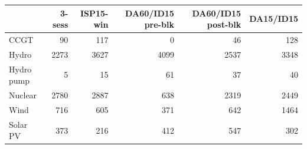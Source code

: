 \begin{tabular}{l r r r r r}
\toprule
 & 3-sess & ISP15-win & DA60/ID15 pre-blk & DA60/ID15 post-blk & DA15/ID15 \\
\midrule
CCGT & 90 & 117 & 0 & 46 & 128 \\
Hydro & 2273 & 3627 & 4099 & 2537 & 3348 \\
Hydro pump & 5 & 15 & 61 & 37 & 40 \\
Nuclear & 2780 & 2887 & 638 & 2319 & 2449 \\
Wind & 716 & 605 & 371 & 642 & 1464 \\
Solar PV & 373 & 216 & 412 & 547 & 302 \\
\bottomrule
\end{tabular}
